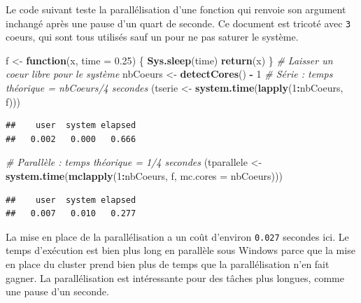 \documentclass[
  12pt,
  french,
  a4paper,
  extrafontsizes,onecolumn,openright
  ]{memoir}
\newenvironment{Shaded}{\begin{snugshade}}{\end{snugshade}}
\newcommand{\CommentTok}[1]{\textcolor[rgb]{0.56,0.35,0.01}{\textit{#1}}}
\newcommand{\ControlFlowTok}[1]{\textcolor[rgb]{0.13,0.29,0.53}{\textbf{#1}}}
\newcommand{\DataTypeTok}[1]{\textcolor[rgb]{0.13,0.29,0.53}{#1}}
\newcommand{\DecValTok}[1]{\textcolor[rgb]{0.00,0.00,0.81}{#1}}
\newcommand{\FloatTok}[1]{\textcolor[rgb]{0.00,0.00,0.81}{#1}}
\newcommand{\KeywordTok}[1]{\textcolor[rgb]{0.13,0.29,0.53}{\textbf{#1}}}
\newcommand{\NormalTok}[1]{#1}
\newcommand{\OperatorTok}[1]{\textcolor[rgb]{0.81,0.36,0.00}{\textbf{#1}}}
\newcommand{\StringTok}[1]{\textcolor[rgb]{0.31,0.60,0.02}{#1}}
\begin{document}
\normalsize

Le code suivant teste la parallélisation d'une fonction qui renvoie son argument inchangé après une pause d'un quart de seconde.
Ce document est tricoté avec \texttt{3} coeurs, qui sont tous utilisés sauf un pour ne pas saturer le système.

\scriptsize

\begin{Shaded}
\begin{Highlighting}[]
\NormalTok{f <-}\StringTok{ }\ControlFlowTok{function}\NormalTok{(x, }\DataTypeTok{time =} \FloatTok{0.25}\NormalTok{) \{}
    \KeywordTok{Sys.sleep}\NormalTok{(time)}
    \KeywordTok{return}\NormalTok{(x)}
\NormalTok{\}}
\CommentTok{# Laisser un coeur libre pour le système}
\NormalTok{nbCoeurs <-}\StringTok{ }\KeywordTok{detectCores}\NormalTok{() }\OperatorTok{-}\StringTok{ }\DecValTok{1}
\CommentTok{# Série : temps théorique = nbCoeurs/4 secondes}
\NormalTok{(tserie <-}\StringTok{ }\KeywordTok{system.time}\NormalTok{(}\KeywordTok{lapply}\NormalTok{(}\DecValTok{1}\OperatorTok{:}\NormalTok{nbCoeurs, f)))}
\end{Highlighting}
\end{Shaded}

\begin{verbatim}
##    user  system elapsed 
##   0.002   0.000   0.666
\end{verbatim}

\begin{Shaded}
\begin{Highlighting}[]
\CommentTok{# Parallèle : temps théorique = 1/4 secondes}
\NormalTok{(tparallele <-}\StringTok{ }\KeywordTok{system.time}\NormalTok{(}\KeywordTok{mclapply}\NormalTok{(}\DecValTok{1}\OperatorTok{:}\NormalTok{nbCoeurs, f, }\DataTypeTok{mc.cores =}\NormalTok{ nbCoeurs)))}
\end{Highlighting}
\end{Shaded}

\begin{verbatim}
##    user  system elapsed 
##   0.007   0.010   0.277
\end{verbatim}

\normalsize

La mise en place de la parallélisation a un coût d'environ \texttt{0.027} secondes ici.
Le temps d'exécution est bien plus long en parallèle sous Windows parce que la mise en place du cluster prend bien plus de temps que la parallélisation n'en fait gagner.
La parallélisation est intéressante pour des tâches plus longues, comme une pause d'un seconde.
\end{document}

